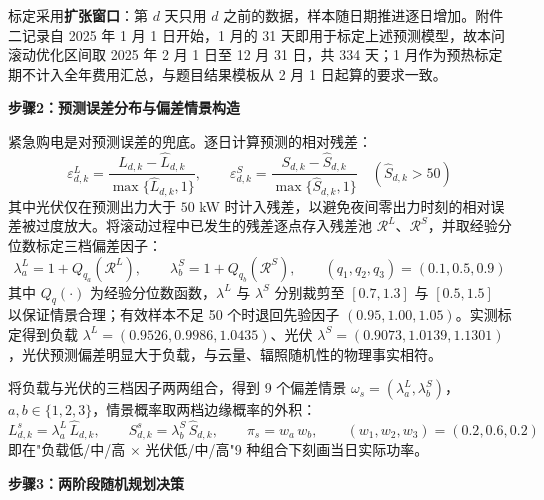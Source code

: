 标定采用\textbf{扩张窗口}：第 $d$ 天只用 $d$ 之前的数据，样本随日期推进逐日增加。附件二记录自 2025 年 1 月 1 日开始，1 月的 31 天即用于标定上述预测模型，故本问滚动优化区间取 2025 年 2 月 1 日至 12 月 31 日，共 334 天；1 月作为预热标定期不计入全年费用汇总，与题目结果模板从 2 月 1 日起算的要求一致。

\textbf{步骤2：预测误差分布与偏差情景构造}

紧急购电是对预测误差的兜底。逐日计算预测的相对残差：
\begin{equation}
    \varepsilon^{L}_{d,k}=\frac{L_{d,k}-\hat L_{d,k}}{\max\{\hat L_{d,k},1\}},\qquad
    \varepsilon^{S}_{d,k}=\frac{S_{d,k}-\hat S_{d,k}}{\max\{\hat S_{d,k},1\}}\quad(\hat S_{d,k}>50)
\end{equation}
其中光伏仅在预测出力大于 $50$ kW 时计入残差，以避免夜间零出力时刻的相对误差被过度放大。将滚动过程中已发生的残差逐点存入残差池 $\mathcal{R}^{L}$、$\mathcal{R}^{S}$，并取经验分位数标定三档偏差因子：
\begin{equation}
    \lambda^{L}_{a}=1+Q_{q_a}\!\left(\mathcal{R}^{L}\right),\qquad
    \lambda^{S}_{b}=1+Q_{q_b}\!\left(\mathcal{R}^{S}\right),\qquad
    (q_1,q_2,q_3)=(0.1,0.5,0.9)
\end{equation}
其中 $Q_{q}(\cdot)$ 为经验分位数函数，$\lambda^{L}$ 与 $\lambda^{S}$ 分别裁剪至 $[0.7,1.3]$ 与 $[0.5,1.5]$ 以保证情景合理；有效样本不足 50 个时退回先验因子 $(0.95,1.00,1.05)$。实测标定得到负载 $\lambda^{L}=(0.9526,0.9986,1.0435)$、光伏 $\lambda^{S}=(0.9073,1.0139,1.1301)$，光伏预测偏差明显大于负载，与云量、辐照随机性的物理事实相符。

将负载与光伏的三档因子两两组合，得到 9 个偏差情景 $\omega_s=(\lambda^{L}_{a},\lambda^{S}_{b})$，$a,b\in\{1,2,3\}$，情景概率取两档边缘概率的外积：
\begin{equation}
    L^{s}_{d,k}=\lambda^{L}_{a}\,\hat L_{d,k},\qquad
    S^{s}_{d,k}=\lambda^{S}_{b}\,\hat S_{d,k},\qquad
    \pi_s=w_a\,w_b,\qquad (w_1,w_2,w_3)=(0.2,0.6,0.2)
\end{equation}
即在"负载低/中/高 $\times$ 光伏低/中/高"9 种组合下刻画当日实际功率。

\textbf{步骤3：两阶段随机规划决策}

